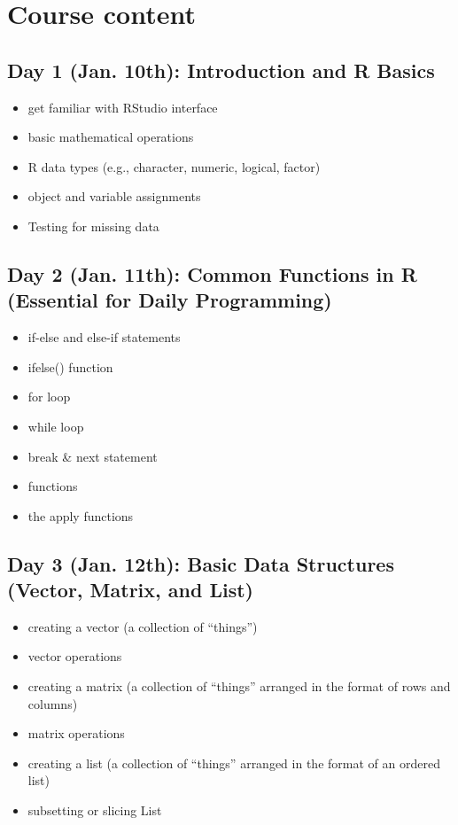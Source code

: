\documentclass[11pt, a4paper]{article}
\begin{document}

\newpage
\section*{Course content}
\subsection*{Day 1 (Jan. 10th): Introduction and R Basics}

\begin{itemize}
   \item get familiar with RStudio interface
   \item basic mathematical operations
   \item R data types (e.g., character, numeric, logical, factor)
   \item object and variable assignments
   \item Testing for missing data
\end{itemize}

\subsection*{Day 2 (Jan. 11th): Common Functions in R (Essential for Daily Programming)}
\begin{itemize}
   \item if-else and else-if statements
   \item ifelse() function
   \item for loop 
   \item while loop
   \item break \& next statement 
   \item functions
   \item the apply functions
\end{itemize}


\subsection*{Day 3 (Jan. 12th): Basic Data Structures (Vector, Matrix, and List)}

\begin{itemize}
   \item creating a vector (a collection of ``things'')
   \item vector operations
   \item creating a matrix (a collection of ``things'' arranged in the format of rows and columns)
   \item matrix operations
   \item creating a list (a collection of ``things'' arranged in the format of an ordered list)
   \item subsetting or slicing List
\end{itemize}
\end{document}
